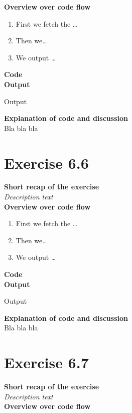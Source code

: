 \documentclass{article}
\newcommand\pythonstyle{\lstset{
language=python,
breaklines=true,
basicstyle=\ttfamily\small,
otherkeywords={1, 2, 3, 4, 5, 6, 7, 8 ,9 , 0, -, =, +, [, ], (, \), \{, \}, :, *, !},             %
keywordstyle=\color{blue},
emph={class, pass, in, for, while, if, is, elif, else, not, and, or, OR
    def, print, exec, break, continue, return},
emphstyle=\color{black}\bfseries,
emph={[2]True, False, None, self},
emphstyle=[2]\color{purple},
emph={[3]from, import, as},
emphstyle=[3]\color{blue},
stringstyle=\color{red},
frame=tb,
showstringspaces=false,
morecomment=[s]{"""}{"""},
commentstyle=\color{gray},
rulesepcolor=\color{blue},
title=\lstname
}}
\newcommand\pythonexternal[2][]{{
\pythonstyle
}}
\begin{document}
\textbf{Overview over code flow}\\

\begin{enumerate}
  \item First we fetch the \ldots
  \item Then we\ldots
  \item We output \ldots\\
\end{enumerate}

\textbf{Code}\\
\textbf{Output}
\begin{pythonOutput}
Output
\end{pythonOutput}
\textbf{Explanation of code and discussion}\\
Bla bla bla
\section{Exercise 6.6}
\textbf{Short recap of the exercise}\\
\textit{Description text}\\

\textbf{Overview over code flow}\\

\begin{enumerate}
  \item First we fetch the \ldots
  \item Then we\ldots
  \item We output \ldots\\
\end{enumerate}

\textbf{Code}\\
\textbf{Output}
\begin{pythonOutput}
Output
\end{pythonOutput}
\textbf{Explanation of code and discussion}\\
Bla bla bla
\section{Exercise 6.7}
\textbf{Short recap of the exercise}\\
\textit{Description text}\\

\textbf{Overview over code flow}\\
\end{document}
